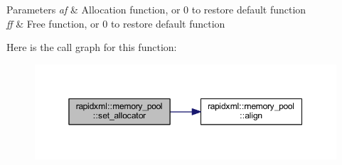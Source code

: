 \begin{DoxyParams}{Parameters}
{\em af} & Allocation function, or 0 to restore default function \\
\hline
{\em ff} & Free function, or 0 to restore default function \\
\hline
\end{DoxyParams}


Here is the call graph for this function\+:
\nopagebreak
\begin{figure}[H]
\begin{center}
\leavevmode
\includegraphics[width=350pt]{classrapidxml_1_1memory__pool_a84d3d8d2cdfc00501e1dcf26d889ae03_cgraph}
\end{center}
\end{figure}




